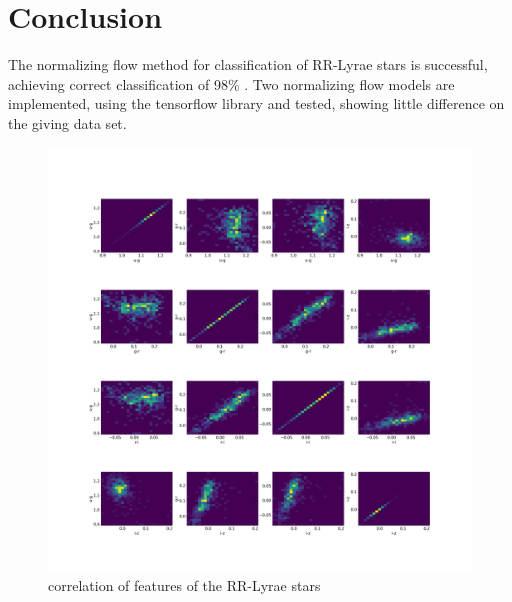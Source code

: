 \documentclass[%
 reprint,
 amsmath,amssymb,
 aps,
]{revtex4-2}
\begin{document}
\section{Conclusion}
The normalizing flow method for classification of RR-Lyrae stars is successful, achieving correct classification of 98\% . Two normalizing flow models are implemented, using the tensorflow library and tested, showing little difference on the giving data set. 




 \begin{figure}[]
	\centering
	\includegraphics[width=1\textwidth]{figs/correlation_features_label1.png}
	\caption[ correlation of features of the RR-Lyrae stars]
	{\small correlation of features of the RR-Lyrae stars} 
		\label{fig:corr1}
	
\end{figure}
\end{document}
